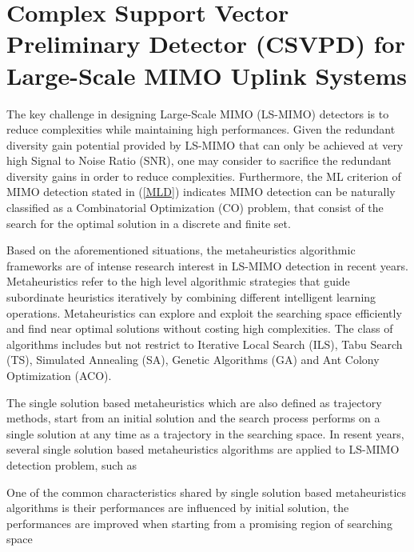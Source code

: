 \resetdatestamp



\chapter{Complex Support Vector Preliminary Detector (CSVPD) for Large-Scale MIMO Uplink Systems}
The key challenge in designing Large-Scale MIMO (LS-MIMO) detectors is to reduce complexities while maintaining high performances. Given the redundant diversity gain potential provided by LS-MIMO\cite{oestges2010mimo} that can only be achieved at very high Signal to Noise Ratio (SNR), one may consider to sacrifice the redundant diversity gains in order to reduce complexities. Furthermore, the ML criterion of MIMO detection stated in (\ref{MLD}) indicates MIMO detection can be naturally classified as a Combinatorial Optimization (CO) problem, that consist of the search for the optimal solution in a discrete and finite set. 

Based on the aforementioned situations, the metaheuristics algorithmic frameworks are of intense research interest in LS-MIMO detection in recent years. Metaheuristics refer to the high level algorithmic strategies that guide subordinate heuristics iteratively by combining different intelligent learning operations. Metaheuristics can explore and exploit the searching space efficiently and find near optimal solutions without costing high complexities. The class of algorithms includes but not restrict to Iterative Local Search (ILS), Tabu Search (TS), Simulated Annealing (SA), Genetic Algorithms (GA) and Ant Colony Optimization (ACO).

The single solution based metaheuristics which are also defined as trajectory methods, start from an initial solution and the search process performs on a single solution at any time as a trajectory in the searching space. In resent years, several single solution based metaheuristics algorithms are applied to LS-MIMO detection problem, such as 

 One of the common characteristics shared by single solution based metaheuristics algorithms is their performances are influenced by initial solution, the performances are improved when starting from a promising region of searching space  

 


